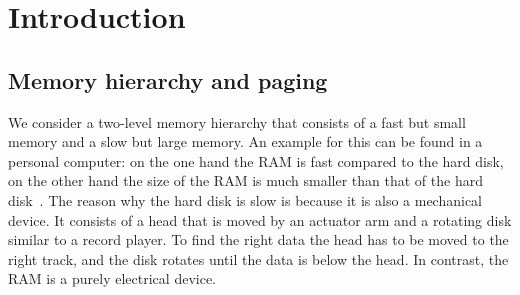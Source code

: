 \documentclass[a4paper,12pt, titlepage]{article}  %
\newcommand{\oh}{\mathcal{O}}   %
\begin{document}




\clearpage

\tableofcontents
\newpage

\pagestyle{plain}
\setcounter{page}{1} %


\section{Introduction}

\subsection{Memory hierarchy and paging}
We consider a two-level memory hierarchy that consists of a fast but small memory and a slow but large memory.
An example for this can be found in a personal computer: on the one hand the RAM is fast compared to the hard disk, 
on the other hand the size of the RAM is much smaller than that of the hard disk~\cite{memory_hierarchy}. 
The reason why the hard disk is slow is because it is also a mechanical device. 
It consists of a head that is moved by an actuator arm and a rotating disk similar to a record player. To find the right data the head has to be moved to the right track, and the disk rotates until the data is below the head. In contrast, the RAM is a purely electrical device.     
\end{document}
